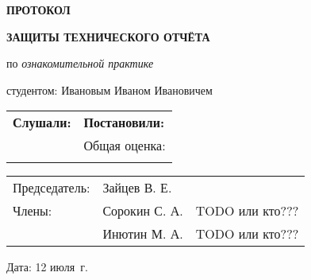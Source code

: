 \begin{center}
\bfseries{\large ПРОТОКОЛ }

\vspace{12pt}

\bfseries{ЗАЩИТЫ ТЕХНИЧЕСКОГО ОТЧЁТА}
\end{center}
\noindent
по {\itshape ознакомительной практике}

\vspace{8pt}
\noindent
студентом:
\noindent
Ивановым Иваном Ивановичем

\begin{longtable}{p{7cm}|p{11cm}}
    \hline
    {\bfseries Слушали:} & {\bfseries Постановили:}  \\
    \rule{0pt}{450pt} & Общая оценка: \underline{\hspace{2in}}\\
    \rule{0pt}{15pt} & \\
    \hline
\end{longtable}

\vfill

\noindent\begin{tabular}{@{}l l l}
Председатель: & Зайцев В. Е. & \underline{\hspace{2in}} \\
Члены: & Сорокин С. А. & \underline{\hspace{2in}} TODO или кто??? \\
& Инютин М. А. & \underline{\hspace{2in}} TODO или кто???
\end{tabular}
\vspace{12pt}

\noindent
Дата: 12 июля \the\year\,г.
\pagebreak
